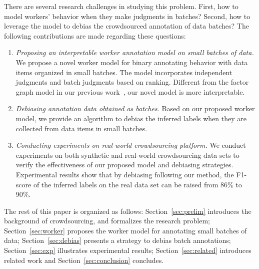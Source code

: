 There are several research challenges in studying this problem.  
First, how to model workers' behavior when they make judgments in batches?  
Second, how to leverage the model to debias the crowdsourced annotation of data batches?
The following contributions are made regarding these questions:
\begin{enumerate}
  \item \emph{Proposing an interpretable worker annotation model on small batches of data.}
        We propose a novel worker model for binary annotating behavior with data items organized in small batches.  
        The model incorporates independent judgments and batch judgments based on ranking.  
        Different from the factor graph model in our previous work~\cite{zhuang:wsdm2015}, 
        our novel model is more interpretable.  
  \item \emph{Debiasing annotation data obtained as batches.}
        Based on our proposed worker model, we provide an algorithm to debias the inferred labels 
        when they are collected from data items in small batches.  
  \item \emph{Conducting experiments on real-world crowdsourcing platform.}  
        We conduct experiments on both synthetic and real-world crowdsourcing data sets 
        to verify the effectiveness of our proposed model and debiasing strategies.  
        Experimental results show that by debiasing following our method, 
        the F1-score of the inferred labels on the real data set can be raised from 86\% to 90\%.  
\end{enumerate}

The rest of this paper is organized as follows:
Section~\ref{sec:prelim} introduces the background of crowdsourcing, and formalizes the research problem;
Section~\ref{sec:worker} proposes the worker model for annotating small batches of data;
Section~\ref{sec:debias} presents a strategy to debias batch annotations;
Section~\ref{sec:exp} illustrates experimental results;
Section~\ref{sec:related} introduces related work and Section~\ref{sec:conclusion} concludes. 






